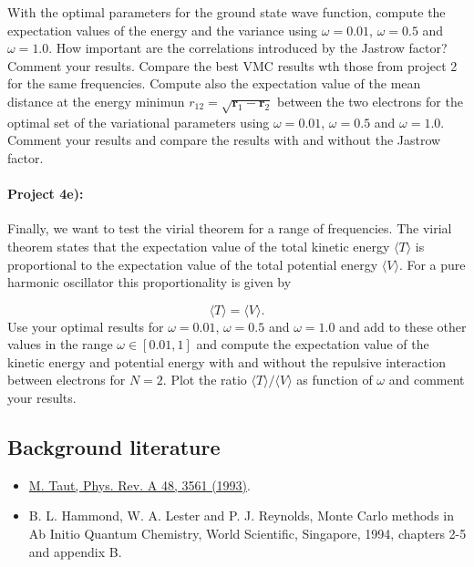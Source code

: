 \documentclass[%
oneside,                 %
final,                   %
10pt]{article}
\begin{document}
With the optimal parameters for the ground state wave function, compute the expectation values of the  energy and the variance using $\omega=0.01$,
  $\omega=0.5$ and $\omega=1.0$. How important are the correlations introduced by the Jastrow factor? Comment your results. Compare the best VMC results wth those from project 2 for the same frequencies.  Compute also the expectation value of the mean distance at the energy minimun 
  $r_{12}=\sqrt{\mathbf{r}_1-\mathbf{r}_2}$ between the two electrons for the optimal set of the variational parameters using $\omega=0.01$,
  $\omega=0.5$ and $\omega=1.0$.  Comment your results and compare the results with and without the Jastrow factor.

\paragraph{Project 4e):}
Finally, we want to test the virial theorem for a range of frequencies. The virial theorem states that the expectation value of the total kinetic energy $\langle T \rangle$ is proportional to the expectation value of the total potential energy $\langle V \rangle$. For a pure harmonic oscillator this proportionality is given by

\begin{equation*}
  \langle T \rangle= \langle V \rangle.
  \end{equation*}
  Use your optimal results for $\omega=0.01$,
  $\omega=0.5$ and $\omega=1.0$ and add to these other values in the range  $\omega\in [0.01,1]$
  and   compute the expectation value of the kinetic energy and potential energy with and without the
  repulsive interaction between electrons for $N=2$. Plot the
  ratio $\langle T \rangle/\langle V \rangle$ as function of
  $\omega$ and comment your results.

\subsection{Background literature}

\begin{itemize}
   \item \href{{http://journals.aps.org/pra/abstract/10.1103/PhysRevA.48.3561}}{M. Taut, Phys. Rev. A 48, 3561 (1993)}.

   \item B. L. Hammond, W. A. Lester and P. J. Reynolds, Monte Carlo methods   in Ab Initio Quantum Chemistry, World Scientific, Singapore, 1994, chapters   2-5 and appendix B.
\end{itemize}
\end{document}

